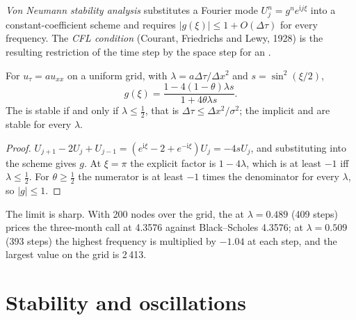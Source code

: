 \begin{definition}\label{def:qm:finite-difference-methods:vn}
\emph{Von Neumann stability analysis} substitutes a Fourier mode $U_j^n = g^ne^{\mathrm ij\xi}$ into a constant-coefficient scheme and requires $|g(\xi)| \le 1 +
O(\Delta\tau)$ for every frequency. The \emph{CFL condition} (Courant, Friedrichs and Lewy, 1928) is the resulting restriction of the time step by the space step for an .
\end{definition}

\begin{proposition}\label{prop:qm:finite-difference-methods:amp}
For $u_\tau = au_{xx}$ on a uniform grid, with $\lambda = a\Delta\tau/\Delta x^2$ and $s = \sin^2(\xi/2)$,
\[g(\xi) = \frac{1 - 4(1 - \theta)\lambda s}{1 + 4\theta\lambda s}.\]
The  is stable if and only if $\lambda \le \frac12$, that is $\Delta\tau \le \Delta x^2/\sigma^2$; the implicit and  are stable for every $\lambda$.
\end{proposition}

\begin{proof}
$U_{j+1} - 2U_j + U_{j-1} = (e^{\mathrm i\xi} - 2 + e^{-\mathrm i\xi})U_j = -4sU_j$, and substituting into the scheme gives $g$. At $\xi = \pi$ the explicit factor is $1 - 4\lambda$, which is at least $-1$ iff
$\lambda \le \frac12$. For $\theta \ge \frac12$ the numerator is at least $-1$ times the denominator for every $\lambda$, so $|g| \le 1$.
\end{proof}

The limit is sharp. With 200 nodes over the grid, the  at $\lambda = 0.489$ (409 steps) prices the three-month call at 4.3576 against Black--Scholes 4.3576; at $\lambda = 0.509$ (393
steps) the highest frequency is multiplied by $-1.04$ at each step, and the largest value on the grid is 2\,413.

\section{Stability and oscillations}

